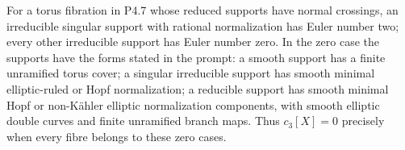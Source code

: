 
\begin{proposition}[P4.8]\hypertarget{tag-02Y0}{}\label{night:P4.8}\label{stmt:P4.8}


For a torus fibration in P4.7 whose reduced supports have normal
crossings, an irreducible singular support with
rational normalization has Euler number two; every other irreducible
support has Euler number zero. In the zero case the supports have the
forms stated in the prompt: a smooth support has a finite unramified
torus cover; a singular irreducible support has smooth minimal
elliptic-ruled or Hopf normalization; a reducible support has smooth
minimal Hopf or non-Kähler elliptic normalization components, with
smooth elliptic double curves and finite unramified branch maps.
Thus $c_3[X]=0$ precisely when every fibre belongs to these zero cases.
\end{proposition}

